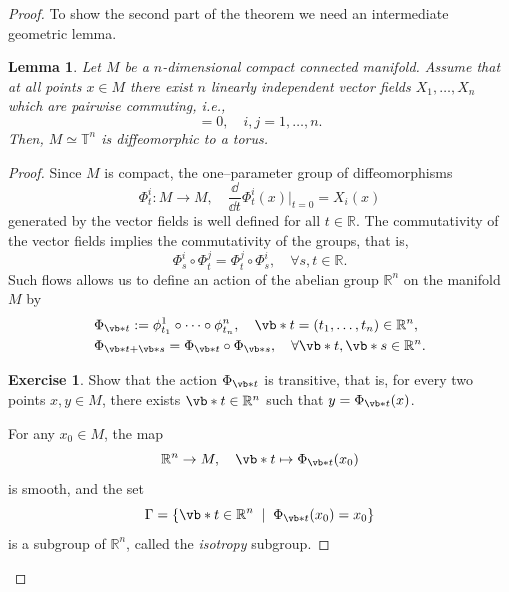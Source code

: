 \documentclass[english,fontsize=11pt,paper=b5]{scrbook}
\newtheorem{lemma}[theorem]{Lemma}
\theoremstyle{definition}
\newtheorem{exercise}{Exercise}[chapter]
\begin{document}
\begin{proof}
        To show the second part of the theorem we need an intermediate geometric lemma.
        \begin{lemma}\label{lemma:isotn}
          Let $M$ be a $n$-dimensional compact connected manifold.
          Assume that at all points $x\in M$ there exist $n$ linearly independent vector fields $X_1, \ldots, X_n$ which are pairwise commuting, i.e.,
          \begin{equation}
            [X_i, X_j] = 0, \quad i,j = 1,\ldots,n.
          \end{equation}
          Then, $M \simeq \mathbb{T}^n$ is diffeomorphic to a torus.
        \end{lemma}
        \begin{proof}
          Since $M$ is compact, the one--parameter group of diffeomorphisms
          \begin{equation}
            \Phi_t^i: M \to M, \quad \frac{\dd}{\dd t} \Phi_t^i(x)\Big|_{t=0} = X_i(x)
          \end{equation}
          generated by the vector fields is well defined for all $t\in\mathbb{R}$.
          The commutativity of the vector fields implies the commutativity of the groups, that is,
          \begin{equation}
            \Phi^i_s \circ \Phi^j_t = \Phi^j_t \circ \Phi^i_s, \quad \forall s,t\in\mathbb{R}.
          \end{equation}
          Such flows allows us to define an action of the abelian group $\mathbb{R}^n$ on the manifold $M$ by
          \begin{align}
       & \Phi_{\vb*{t}} := \phi_{t_1}^1 \circ \cdots \circ \phi_{t_n}^n, \quad \vb*{t} = (t_1, \ldots, t_n)\in \mathbb{R}^n, \\
       & \Phi_{\vb* t + \vb* s} = \Phi_{\vb* t} \circ \Phi_{\vb* s}, \quad \forall \vb* t, \vb* s \in \mathbb{R}^n.
          \end{align}

          \begin{exercise}
            Show that the action $\Phi_{\vb* t}$ is transitive, that is, for every two points $x, y\in M$, there exists $\vb* t\in\mathbb{R}^n$ such that $y = \Phi_{\vb* t} (x)$.
          \end{exercise}

          For any $x_0 \in M$, the map
          \begin{equation}\label{eq:diffeoRnM}
            \mathbb{R}^n \to M, \quad \vb* t \mapsto \Phi_{\vb* t}(x_0)
          \end{equation}
          is smooth, and the set
          \begin{equation}
            \Gamma = \left\{ \vb* t \in \mathbb{R}^n \;\mid\; \Phi_{\vb* t}(x_0) = x_0\right\}
          \end{equation}
          is a subgroup of $\mathbb{R}^n$, called the \emph{isotropy} subgroup.


\end{proof}
\end{proof}
\end{document}

